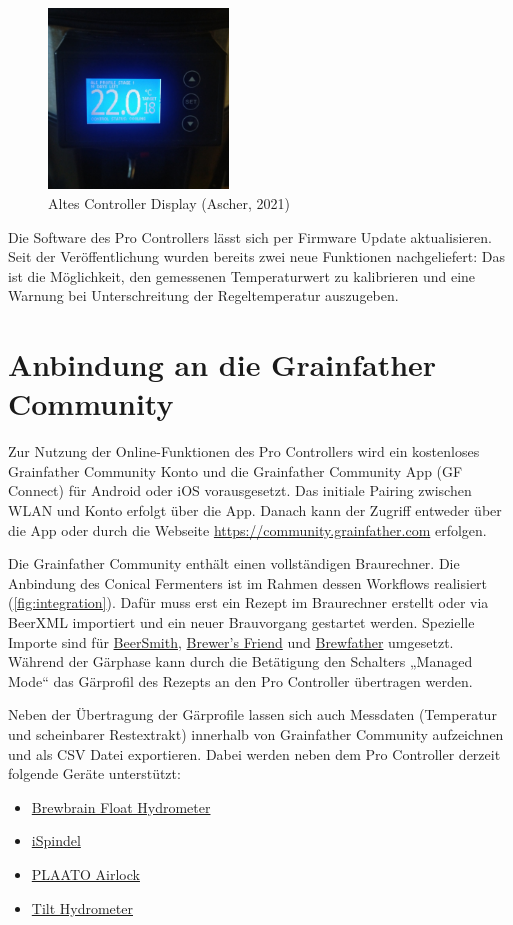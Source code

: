 \documentclass[a4paper,parskip=half]{scrartcl}
\begin{document}
\begin{figure}[H]
\centering
\includegraphics[width=4.8cm]{images/gfpc_display_old_main.jpg}
\caption{Altes Controller Display (Ascher, 2021)}
\label{fig:displayoldmain}
\end{figure}

Die Software des Pro Controllers lässt sich per Firmware Update
aktualisieren. Seit der Veröffentlichung wurden bereits zwei
neue Funktionen nachgeliefert: Das ist die Möglichkeit, den
gemessenen Temperaturwert zu kalibrieren und eine Warnung
bei Unterschreitung der Regeltemperatur auszugeben.

\section*{Anbindung an die Grainfather Community}

Zur Nutzung der Online-Funktionen des Pro Controllers wird ein
kostenloses Grainfather Community Konto und die Grainfather
Community App (GF Connect) für Android oder iOS vorausgesetzt.
Das initiale Pairing zwischen WLAN und Konto erfolgt über die App.
Danach kann der Zugriff entweder über die App oder durch die
Webseite \url{https://community.grainfather.com} erfolgen.

Die Grainfather Community enthält einen vollständigen
Braurechner. Die Anbindung des Conical Fermenters ist
im Rahmen dessen Workflows realisiert (\autoref{fig:integration}).
Dafür muss erst ein Rezept im Braurechner erstellt oder
via BeerXML importiert und ein neuer Brauvorgang gestartet werden.
Spezielle Importe sind für \href{https://beersmith.com}{BeerSmith},
\href{https://www.brewersfriend.com}{Brewer's Friend} und
\href{https://brewfather.app}{Brewfather} umgesetzt. Während
der Gärphase kann durch die Betätigung den Schalters „Managed Mode“
das Gärprofil des Rezepts an den Pro Controller übertragen werden.

Neben der Übertragung der Gärprofile lassen sich auch
Messdaten (Temperatur und scheinbarer Restextrakt) innerhalb von Grainfather Community aufzeichnen und als CSV Datei exportieren. Dabei werden neben dem Pro Controller derzeit folgende
Geräte unterstützt:
\begin{itemize}
\item \href{https://brewbrain.nl}{Brewbrain Float Hydrometer}
\item \href{https://www.ispindel.de}{iSpindel}
\item \href{https://plaato.io/products/plaato-airlock}{PLAATO Airlock} 
\item \href{https://tilthydrometer.com}{Tilt Hydrometer}
\end{itemize}
\end{document}

